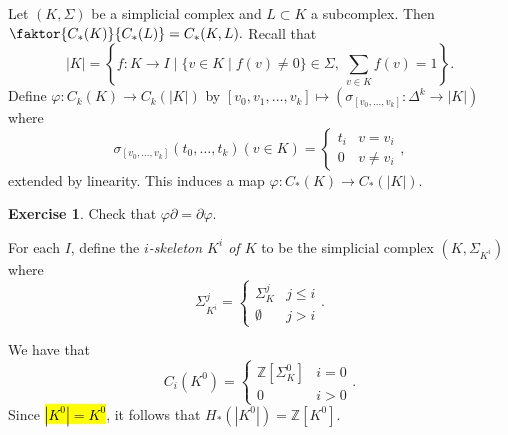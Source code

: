 \documentclass[10pt,letterpaper,cm]{nupset}
\theoremstyle{definition}
\theoremstyle{theorem}
\newtheorem{exercise}[definition]{Exercise}
\theoremstyle{remark}
\newcommand{\Z}{\mathbb Z}
\newcommand{\1}{\mathbb{1}}
\newcommand{\0}{\vec 0}
\begin{document}
\smallskip

Let $(K, \Sigma)$ be a simplicial complex and $L \subset K$ a subcomplex. Then  $\faktor{C_{\ast}(K)}{C_{\ast}(L)} = C_{\ast}(K,L).$ Recall that $$\left\lvert{K}\right\rvert=\left\{f: K \to I \mid \{v\in K \mid f(v) \ne 0\} \in \Sigma, \ \sum_{v\in K}f(v) =1\right\} .$$ Define $\varphi : C_k(K) \to C_k(\left\lvert{K}\right\rvert)$ by $\left[v_0, v_1, \ldots, v_k\right] \mapsto \left(\sigma_{\left[v_0, \ldots, v_k\right]} : \Delta^k \to \left\lvert{K}\right\rvert\right)$ where $$\sigma_{\left[v_0, \ldots, v_k\right]}(t_0, \ldots, t_k)(v \in K) = \begin{cases} t_i & v=v_i \\ 0 & v \ne v_i \end{cases},$$ extended by linearity. This induces a map $\varphi : C_{\ast}(K) \to C_{\ast}(\left\lvert{K}\right\rvert)$.


\begin{exercise}
Check that $\varphi \partial = \partial \varphi$.
\end{exercise}


For each $I$, define the \textit{$i$-skeleton $K^i$ of $K$} to be the simplicial complex $\left(K, \Sigma_{K^i}\right)$ where $$\Sigma_{K^i}^j = \begin{cases} \Sigma_K^j & j \leq i \\ \emptyset & j >i \end{cases}.$$

We have that $$C_i(K^0) = \begin{cases} \Z\left[\Sigma_K^0\right] & i =0 \\ 0 & i>0\end{cases}.$$ Since \hl{$\left\lvert{K^0}\right\rvert = K^0$}, it follows that $H_{\ast}(\left\lvert{K^0}\right\rvert) = \Z\left[K^0\right]$.
\end{document}
